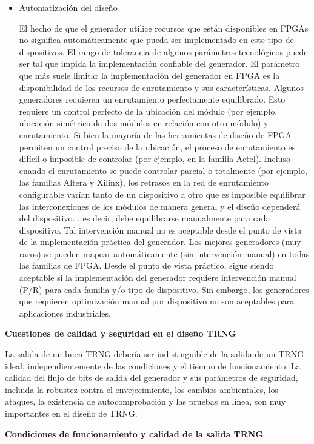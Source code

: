 \begin{itemize}
				\item Automatización del diseño
				
					El hecho de que el generador utilice recursos que están disponibles en FPGAs no significa automáticamente que pueda ser implementado en este tipo de dispositivos. El rango de tolerancia de algunos parámetros tecnológicos puede ser tal que impida la implementación confiable del generador. El parámetro que más suele limitar la implementación del generador en FPGA es la disponibilidad de los recursos de enrutamiento y sus características. Algunos generadores requieren un enrutamiento perfectamente equilibrado. Esto requiere un control perfecto de la ubicación del módulo (por ejemplo, ubicación simétrica de dos módulos en relación con otro módulo) y enrutamiento. Si bien la mayoría de las herramientas de diseño de FPGA permiten un control preciso de la ubicación, el proceso de enrutamiento es difícil o imposible de controlar (por ejemplo, en la familia Actel). Incluso cuando el enrutamiento se puede controlar parcial o totalmente (por ejemplo, las familias Altera y Xilinx), los retrasos en la red de enrutamiento configurable varían tanto de un dispositivo a otro que es imposible equilibrar las interconexiones de los módulos de manera general y el diseño dependerá del dispositivo. , es decir, debe equilibrarse manualmente para cada dispositivo. Tal intervención manual no es aceptable desde el punto de vista de la implementación práctica del generador. Los mejores generadores (muy raros) se pueden mapear automáticamente (sin intervención manual) en todas las familias de FPGA. Desde el punto de vista práctico, sigue siendo aceptable si la implementación del generador requiere intervención manual (P/R) para cada familia y/o tipo de dispositivo. Sin embargo, los generadores que requieren optimización manual por dispositivo no son aceptables para aplicaciones industriales.
			\end{itemize}
			
			\textbf{Cuestiones de calidad y seguridad en el diseño TRNG}
			
			La salida de un buen TRNG debería ser indistinguible de la salida de un TRNG ideal, independientemente de las condiciones y el tiempo de funcionamiento. La calidad del flujo de bits de salida del generador y sus parámetros de seguridad, incluida la robustez contra el envejecimiento, los cambios ambientales, los ataques, la existencia de autocomprobación y las pruebas en línea, son muy importantes en el diseño de TRNG.
			
			
			\textbf{Condiciones de funcionamiento y calidad de la salida TRNG}
			
